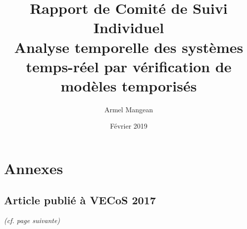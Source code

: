 \documentclass{article}
\title{%
  Rapport de Comité de Suivi Individuel \\
  {\bf Analyse temporelle des systèmes temps-réel %
    par vérification de modèles temporisés}}
\author{Armel Mangean}
\date{Février 2019}
\begin{document}
  \maketitle

  
  
  
  


  \appendix
  \section*{Annexes}
  \subsection*{Article publié à VECoS 2017}
  \emph{(cf. page suivante)}
  \vfill

  
\end{document}
